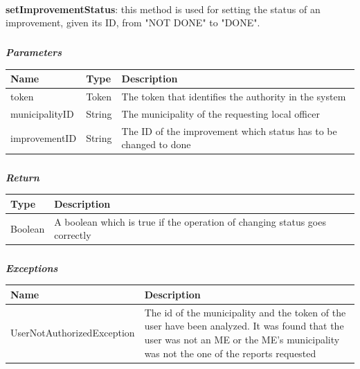 					\paragraph{}
							\textbf{setImprovementStatus}: this method is used for setting the status of an improvement, given its ID, from "NOT DONE" to "DONE".
							\subparagraph{}
							\textit{\textbf{Parameters}}
								\begin{table}[!h]
									\begin{tabular}{L{0.2\textwidth}L{0.2\textwidth}L{0.2\textwidth}}
										\toprule
										Name & Type & Description \\
										\midrule
								  		token & Token & The token that identifies the authority in the system \\
								  		municipalityID & String & The municipality of the requesting local officer \\
								  		improvementID & String & The ID of the improvement which status has to be changed to done \\
								 		\bottomrule
									\end{tabular}
								\end{table}
							\subparagraph{}
								\textit{\textbf{Return}}
									\begin{table}[!h]
									\begin{tabular}{L{0.3\textwidth}L{0.3\textwidth}}
										\toprule
										Type & Description \\
										\midrule
								  		Boolean & A boolean which is true if the operation of changing status goes correctly \\
								 		\bottomrule
									\end{tabular}
								\end{table}
							\subparagraph{}
								\textit{\textbf{Exceptions}}
									\begin{table}[!h]
									\begin{tabular}{L{0.3\textwidth}L{0.3\textwidth}}
										\toprule
										Name & Description \\
										\midrule
								  	UserNotAuthorizedException & The id of the municipality and the token of the user have been analyzed. It was found that the user was not an ME or the ME's municipality was not the one of the reports requested \\
								 		\bottomrule
									\end{tabular}
								\end{table}
					
